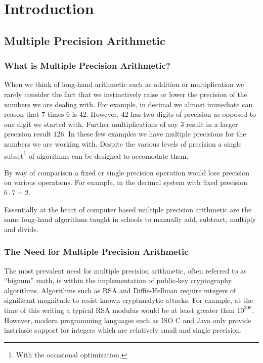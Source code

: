 \documentclass[b5paper]{book}
\begin{document}
\mainmatter
\pagestyle{headings}
\chapter{Introduction}
\section{Multiple Precision Arithmetic}

\subsection{What is Multiple Precision Arithmetic?}
When we think of long-hand arithmetic such as addition or multiplication we rarely consider the fact that we instinctively
raise or lower the precision of the numbers we are dealing with.  For example, in decimal we almost immediate can 
reason that $7$ times $6$ is $42$.  However, $42$ has two digits of precision as opposed to one digit we started with.  
Further multiplications of say $3$ result in a larger precision result $126$.  In these few examples we have multiple 
precisions for the numbers we are working with.  Despite the various levels of precision a single subset\footnote{With the occasional optimization.}
 of algorithms can be designed to accomodate them.  

By way of comparison a fixed or single precision operation would lose precision on various operations.  For example, in
the decimal system with fixed precision $6 \cdot 7 = 2$.

Essentially at the heart of computer based multiple precision arithmetic are the same long-hand algorithms taught in
schools to manually add, subtract, multiply and divide.  

\subsection{The Need for Multiple Precision Arithmetic}
The most prevalent need for multiple precision arithmetic, often referred to as ``bignum'' math, is within the implementation
of public-key cryptography algorithms.   Algorithms such as RSA \cite{RSAREF} and Diffie-Hellman \cite{DHREF} require 
integers of significant magnitude to resist known cryptanalytic attacks.  For example, at the time of this writing a 
typical RSA modulus would be at least greater than $10^{309}$.  However, modern programming languages such as ISO C \cite{ISOC} and 
Java \cite{JAVA} only provide instrinsic support for integers which are relatively small and single precision.
\end{document}
